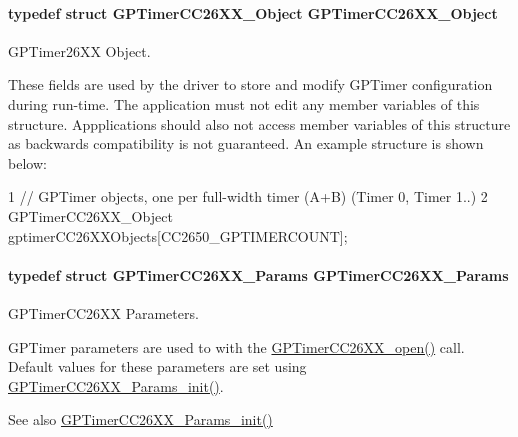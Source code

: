 \paragraph[{G\+P\+Timer\+C\+C26\+X\+X\+\_\+\+Object}]{\setlength{\rightskip}{0pt plus 5cm}typedef struct {\bf G\+P\+Timer\+C\+C26\+X\+X\+\_\+\+Object}  {\bf G\+P\+Timer\+C\+C26\+X\+X\+\_\+\+Object}}\label{_g_p_timer_c_c26_x_x_8h_a98c0a6722f2d48af3b7c032235181bd1}


G\+P\+Timer26\+X\+X Object. 

These fields are used by the driver to store and modify G\+P\+Timer configuration during run-\/time. The application must not edit any member variables of this structure. Appplications should also not access member variables of this structure as backwards compatibility is not guaranteed. An example structure is shown below\+: 
\begin{DoxyCode}
1 // GPTimer objects, one per full-width timer (A+B) (Timer 0, Timer 1..)
2 GPTimerCC26XX\_Object gptimerCC26XXObjects[CC2650\_GPTIMERCOUNT];
\end{DoxyCode}
\paragraph[{G\+P\+Timer\+C\+C26\+X\+X\+\_\+\+Params}]{\setlength{\rightskip}{0pt plus 5cm}typedef struct {\bf G\+P\+Timer\+C\+C26\+X\+X\+\_\+\+Params}  {\bf G\+P\+Timer\+C\+C26\+X\+X\+\_\+\+Params}}\label{_g_p_timer_c_c26_x_x_8h_ad5264b3636e1d40a6cbd64cf150be32d}


G\+P\+Timer\+C\+C26\+X\+X Parameters. 

G\+P\+Timer parameters are used to with the \hyperlink{_g_p_timer_c_c26_x_x_8h_a30f6c028f0abea0b35c3be3d1609ea9b}{G\+P\+Timer\+C\+C26\+X\+X\+\_\+open()} call. Default values for these parameters are set using \hyperlink{_g_p_timer_c_c26_x_x_8h_a11e9f3ff24f5f075989f89d99e65e827}{G\+P\+Timer\+C\+C26\+X\+X\+\_\+\+Params\+\_\+init()}.

\begin{DoxySeeAlso}{See also}
\hyperlink{_g_p_timer_c_c26_x_x_8h_a11e9f3ff24f5f075989f89d99e65e827}{G\+P\+Timer\+C\+C26\+X\+X\+\_\+\+Params\+\_\+init()} 
\end{DoxySeeAlso}


